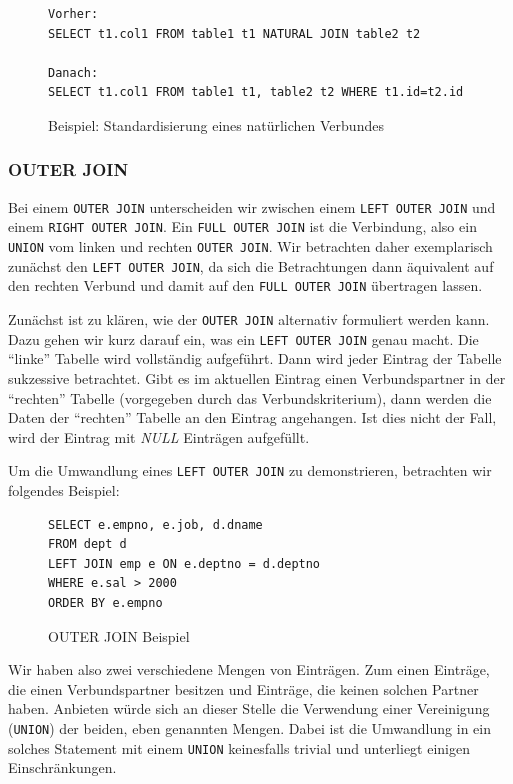 \begin{figure}
\begin{verbatim}
Vorher:
SELECT t1.col1 FROM table1 t1 NATURAL JOIN table2 t2

Danach:
SELECT t1.col1 FROM table1 t1, table2 t2 WHERE t1.id=t2.id
\end{verbatim}
\caption{Beispiel: Standardisierung eines natürlichen Verbundes}
\label{bsp:natjoin}
\end{figure}

\subsubsection*{OUTER JOIN}

Bei einem \verb|OUTER JOIN| unterscheiden wir zwischen einem \verb|LEFT OUTER JOIN| und einem \verb|RIGHT OUTER JOIN|. Ein \verb|FULL OUTER JOIN| ist die Verbindung, also ein \verb|UNION| vom linken und rechten \verb|OUTER JOIN|. Wir betrachten daher exemplarisch zunächst den \verb|LEFT OUTER JOIN|, da sich die Betrachtungen dann äquivalent auf den rechten Verbund und damit auf den \verb|FULL OUTER JOIN| übertragen lassen.

Zunächst ist zu klären, wie der \verb|OUTER JOIN| alternativ formuliert werden kann. Dazu gehen wir kurz darauf ein, was ein \verb|LEFT OUTER JOIN| genau macht. Die ``linke'' Tabelle wird vollständig aufgeführt. Dann wird jeder Eintrag der Tabelle sukzessive betrachtet. Gibt es im aktuellen Eintrag einen Verbundspartner in der ``rechten'' Tabelle (vorgegeben durch das Verbundskriterium), dann werden die Daten der ``rechten'' Tabelle an den Eintrag angehangen. Ist dies nicht der Fall, wird der Eintrag mit \textit{NULL} Einträgen aufgefüllt. 

Um die Umwandlung eines \verb|LEFT OUTER JOIN| zu demonstrieren, betrachten wir folgendes Beispiel:

\begin{figure}[h]
\begin{verbatim}
SELECT e.empno, e.job, d.dname 
FROM dept d 
LEFT JOIN emp e ON e.deptno = d.deptno 
WHERE e.sal > 2000
ORDER BY e.empno
\end{verbatim}
\caption{OUTER JOIN Beispiel}
\end{figure}

Wir haben also zwei verschiedene Mengen von Einträgen. Zum einen Einträge, die einen Verbundspartner besitzen und Einträge, die keinen solchen Partner haben. Anbieten würde sich an dieser Stelle die Verwendung einer Vereinigung (\verb|UNION|) der beiden, eben genannten Mengen. Dabei ist die Umwandlung in ein solches Statement mit einem \verb|UNION| keinesfalls trivial und unterliegt einigen Einschränkungen. 

